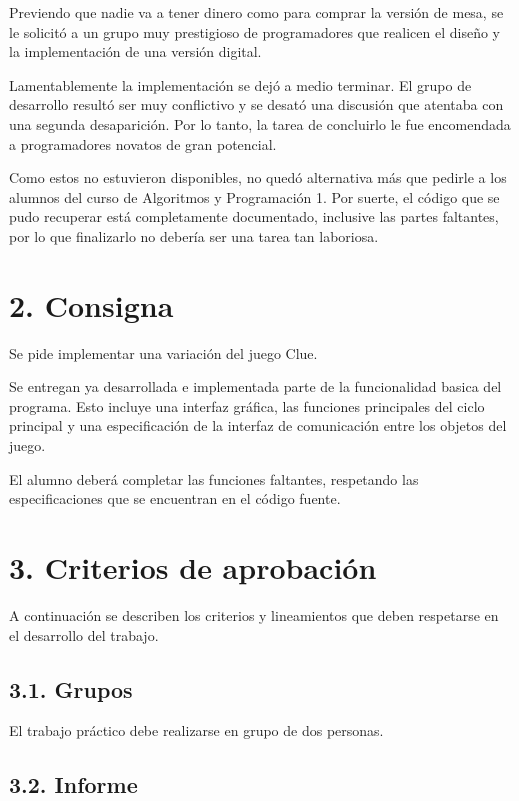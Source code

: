 \documentclass[12pt,spanish,]{article}
\begin{document}
Previendo que nadie va a tener dinero como para comprar la versión de
mesa, se le solicitó a un grupo muy prestigioso de programadores que
realicen el diseño y la implementación de una versión digital.

Lamentablemente la implementación se dejó a medio terminar. El grupo de
desarrollo resultó ser muy conflictivo y se desató una discusión que
atentaba con una segunda desaparición. Por lo tanto, la tarea de
concluirlo le fue encomendada a programadores novatos de gran potencial.

Como estos no estuvieron disponibles, no quedó alternativa más que
pedirle a los alumnos del curso de Algoritmos y Programación 1. Por
suerte, el código que se pudo recuperar está completamente documentado,
inclusive las partes faltantes, por lo que finalizarlo no debería ser
una tarea tan laboriosa.

\section{2. Consigna}\label{consigna}

Se pide implementar una variación del juego Clue.

Se entregan ya desarrollada e implementada parte de la funcionalidad
basica del programa. Esto incluye una interfaz gráfica, las funciones
principales del ciclo principal y una especificación de la interfaz de
comunicación entre los objetos del juego.

El alumno deberá completar las funciones faltantes, respetando las
especificaciones que se encuentran en el código fuente.

\newpage

\section{3. Criterios de aprobación}\label{criterios-de-aprobaciuxf3n}

A continuación se describen los criterios y lineamientos que deben
respetarse en el desarrollo del trabajo.

\subsection{3.1. Grupos}\label{grupos}

El trabajo práctico debe realizarse en grupo de dos personas.

\subsection{3.2. Informe}\label{informe}
\end{document}
